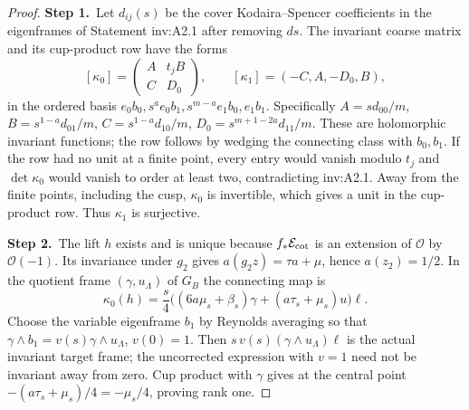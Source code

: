 \begin{proof}
\par\smallskip\noindent\textbf{Step 1.}\ Let $d_{ij}(s)$ be the cover Kodaira--Spencer coefficients in the
eigenframes of Statement inv:A2.1 after removing $ds$.
The invariant coarse matrix and its cup-product row have the forms
\[
[\kappa_0]=\begin{pmatrix}A&t_jB\\C&D_0\end{pmatrix},\qquad
[\kappa_1]=(-C,A,-D_0,B),
\]
in the ordered basis
$e_0b_0,s^ae_0b_1,s^{m-a}e_1b_0,e_1b_1$.  Specifically
$A=sd_{00}/m$, $B=s^{1-a}d_{01}/m$,
$C=s^{1-a}d_{10}/m$, $D_0=s^{m+1-2a}d_{11}/m$.
These are holomorphic invariant functions; the row follows by
wedging the connecting class with $b_0,b_1$.
If the row had no unit at a finite point, every entry would vanish
modulo $t_j$ and $\det\kappa_0$ would vanish to order at least two,
contradicting inv:A2.1.  Away from the finite points, including the cusp,
$\kappa_0$ is invertible, which gives a unit in the cup-product row.
Thus $\kappa_1$ is surjective.

\par\smallskip\noindent\textbf{Step 2.}\ The lift $h$ exists and is unique because $f_*\mathcal E_{\rm cot}$ is an
extension of $\mathcal O$ by $\mathcal O(-1)$.  Its invariance under $g_2$ gives
$a(g_2z)=\tau a+\mu$, hence $a(z_2)=1/2$.
In the quotient frame $(\gamma,u_{\Lambda})$ of $G_B$ the connecting map is
\[
\kappa_0(h)=\frac{s}{4}
\bigl((6a\mu_s+\beta_s)\gamma+(a\tau_s+\mu_s)u\bigr)\ell.
\]
Choose the variable eigenframe $b_1$ by Reynolds averaging so that
$\gamma\wedge b_1=v(s)\gamma\wedge u_{\Lambda}$, $v(0)=1$.
Then $s\,v(s)(\gamma\wedge u_{\Lambda})\ell$ is the actual invariant
target frame; the uncorrected expression with $v=1$ need not be
invariant away from zero.  Cup product with $\gamma$ gives at the
central point $-(a\tau_s+\mu_s)/4=-\mu_s/4$, proving rank one.


\end{proof}
